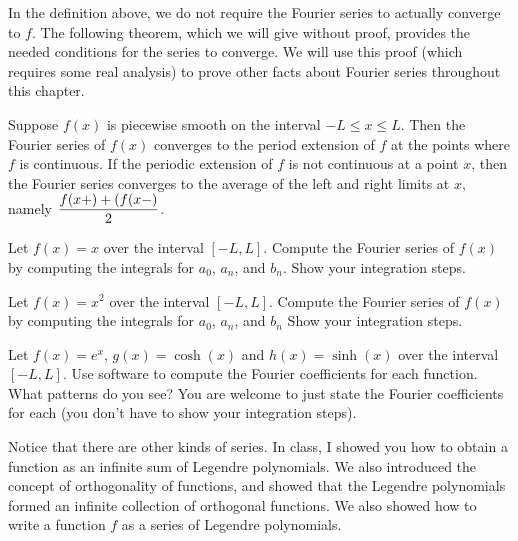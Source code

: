 \begin{remark}
 In the definition above, we do not require the Fourier series to actually converge to $f$. The following theorem, which we will give without proof, provides the needed conditions for the series to converge.  We will use this proof (which requires some real analysis) to prove other facts about Fourier series throughout this chapter.
\end{remark}

\begin{theorem}
 Suppose $f(x)$ is piecewise smooth on the interval $-L\leq x\leq L$. Then the Fourier series of $f(x)$ converges to the period extension of $f$ at the points where $f$ is continuous.  If the periodic extension of $f$ is not continuous at a point $x$, then the Fourier series converges to the average of the left and right limits at $x$, namely $\displaystyle\frac{f(x+)+(f(x-)}{2}$.
\end{theorem}




\begin{problem}
 Let $f(x) = x$ over the interval $[-L,L]$. Compute the Fourier series of $f(x)$ by computing the integrals for $a_0$, $a_n$, and $b_n$.  
Show your integration steps.
\end{problem}

\begin{problem}
 Let $f(x) = x^2$ over the interval $[-L,L]$. Compute the Fourier series of $f(x)$ by computing the integrals for $a_0$, $a_n$, and $b_n$
Show your integration steps.
\end{problem}

\begin{problem}
 Let $f(x) = e^x$, $g(x)=\cosh(x)$ and $h(x)=\sinh(x)$ over the interval $[-L,L]$. Use software to compute the Fourier coefficients for each function.  What patterns do you see?  You are welcome to just state the Fourier coefficients for each (you don't have to show your integration steps). 
\end{problem}









Notice that there are other kinds of series.  In class, I showed you how to obtain a function as an infinite sum of Legendre polynomials. We also introduced the concept of orthogonality of functions, and showed that the Legendre polynomials formed an infinite collection of orthogonal functions. We also showed how to write a function $f$ as a series of Legendre polynomials.  

